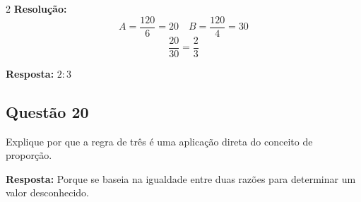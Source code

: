 \documentclass[11pt]{article}
\begin{document}
\begin{multicols}{2}
\textbf{Resolução:}
\[
A = \frac{120}{6} = 20 \quad B = \frac{120}{4} = 30
\]
\[
\frac{20}{30} = \frac{2}{3}
\]

\textbf{Resposta:} $2:3$

\subsection*{Questão 20}
Explique por que a regra de três é uma aplicação direta do conceito de proporção.

\textbf{Resposta:}
Porque se baseia na igualdade entre duas razões para determinar um valor desconhecido.

\end{multicols}
\end{document}
